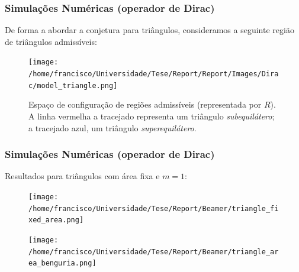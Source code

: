 \documentclass[portuguese,notheorems]{beamer}
\begin{document}
\begin{frame}\frametitle{Simulações Numéricas (operador de Dirac)}
    De forma a abordar a conjetura para triângulos, consideramos a seguinte região de triângulos admissíveis:
    \begin{figure}
        \centering
        \texttt{[image: /home/francisco/Universidade/Tese/Report/Report/Images/Dirac/model\_triangle.png]}
        \caption{Espaço de configuração de regiões admissíveis (representada por $R$). A linha vermelha a tracejado representa um triângulo \textit{subequilátero}; a tracejado azul, um triângulo \textit{superequilátero}.}
    \end{figure}
\end{frame}

\begin{frame}\frametitle{Simulações Numéricas (operador de Dirac)}
    Resultados para triângulos com área fixa e $m=1$:
    \begin{figure}[h]
    \centering
    \begin{minipage}{.45\textwidth}
      \centering
        \texttt{[image: /home/francisco/Universidade/Tese/Report/Beamer/triangle\_fixed\_area.png]}
      \captionsetup{width=0.9\linewidth} %
    \label{dirac_smooth_first_eigenvalue}
\end{minipage}%
    \begin{minipage}{.45\textwidth}
      \centering
      \texttt{[image: /home/francisco/Universidade/Tese/Report/Beamer/triangle\_area\_benguria.png]}
      \captionsetup{width=0.9\linewidth} %
    \label{dirac_triangle_benguria}
\end{minipage}
\end{figure}
\end{frame}

\end{document}
